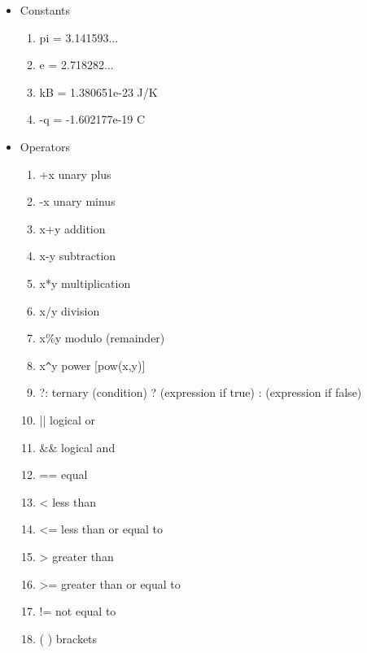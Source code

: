 \begin{itemize}
 \item Constants\begin{enumerate}
                 \item pi = 3.141593...
                 \item e  = 2.718282...
                 \item kB = 1.380651e-23 J/K
                 \item -q = -1.602177e-19 C
                \end{enumerate}
\item Operators\begin{enumerate}
                \item +x     unary plus
		\item -x     unary minus
		\item x+y    addition
		\item x-y    subtraction
		\item x*y    multiplication
		\item x/y    division
		\item x\%y   modulo (remainder)
		\item x\verb|^|y    power \hspace{2mm}[pow(x,y)]
		\item ?:     ternary  (condition) ? (expression if true) : (expression if false)
		\item ||     logical or
		\item \&\&     logical and
		\item ==     equal
		\item <      less than
		\item <=     less than or equal to
		\item >      greater than
		\item >=     greater than or equal to
		\item !=     not equal to
		\item ( )    brackets
               \end{enumerate}
\newpage 


\end{itemize}
